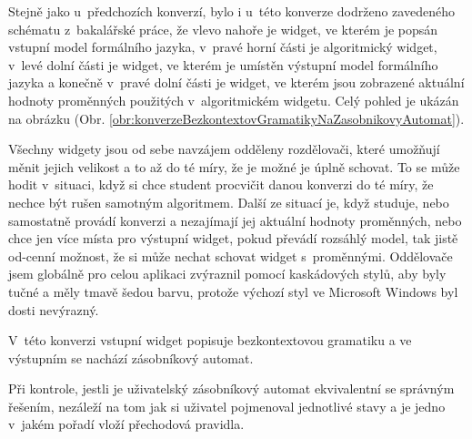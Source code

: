 
Stejně jako u~předchozích konverzí, bylo i u~této konverze dodrženo zavedeného schématu z~bakalářské práce, že vlevo nahoře je widget, ve kterém je popsán vstupní model formálního jazyka, v~pravé horní části je algoritmický widget, v~levé dolní části je widget, ve kterém je umístěn výstupní model formálního jazyka a konečně v~pravé dolní části je widget, ve kterém jsou zobrazené aktuální hodnoty proměnných použitých v~algoritmickém widgetu. Celý pohled je ukázán na obrázku (Obr. \ref{obr:konverzeBezkontextovGramatikyNaZasobnikovyAutomat}). 

Všechny widgety jsou od sebe navzájem odděleny rozdělovači, které umožňují měnit jejich velikost a to až do té míry, že je možné je úplně schovat. To se může hodit v~situaci, když si chce student procvičit danou konverzi do té míry, že nechce být rušen samotným algoritmem. Další ze situací je, když studuje, nebo samostatně provádí konverzi a nezajímají jej aktuální hodnoty proměnných, nebo chce jen více místa pro výstupní widget, pokud převádí rozsáhlý model, tak jistě od-cenní možnost, že si může nechat schovat widget s~proměnnými. Oddělovače jsem globálně pro celou aplikaci zvýraznil pomocí kaskádových stylů, aby byly tučné a měly tmavě šedou barvu, protože výchozí styl ve Microsoft Windows byl dosti nevýrazný.

V~této konverzi vstupní widget popisuje bezkontextovou gramatiku a ve výstupním se nachází zásobníkový automat.

Při kontrole, jestli je uživatelský zásobníkový automat ekvivalentní se správným řešením, nezáleží na tom jak si uživatel pojmenoval jednotlivé stavy a je jedno v~jakém pořadí vloží přechodová pravidla.



